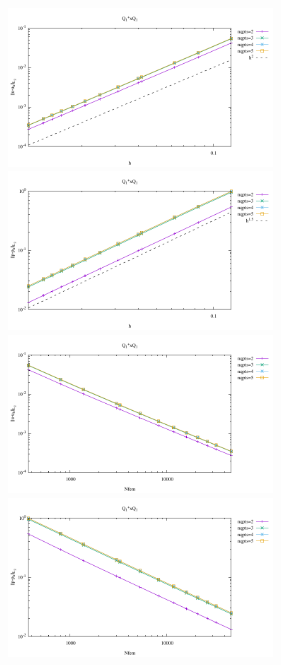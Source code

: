 \begin{center}
\includegraphics[width=7cm]{python_codes/fieldstone_120/results/Q1+Q1-velocity-h.pdf}
\includegraphics[width=7cm]{python_codes/fieldstone_120/results/Q1+Q1-pressure-h.pdf}
\includegraphics[width=7cm]{python_codes/fieldstone_120/results/Q1+Q1-velocity-Nfem.pdf}
\includegraphics[width=7cm]{python_codes/fieldstone_120/results/Q1+Q1-pressure-Nfem.pdf}
\end{center}

